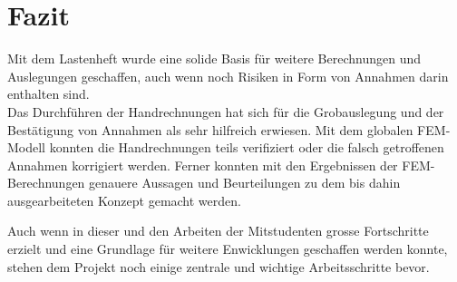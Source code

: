 \newpage

\section{Fazit}
Mit dem Lastenheft wurde eine solide Basis für weitere Berechnungen und Auslegungen geschaffen, auch wenn noch Risiken in Form von Annahmen darin enthalten sind.\\
Das Durchführen der Handrechnungen hat sich für die Grobauslegung und der Bestätigung von Annahmen als sehr hilfreich erwiesen. Mit dem globalen FEM-Modell konnten die Handrechnungen teils verifiziert oder die falsch getroffenen Annahmen korrigiert werden. Ferner konnten mit den Ergebnissen der FEM-Berechnungen genauere Aussagen und Beurteilungen zu dem bis dahin ausgearbeiteten Konzept gemacht werden.

Auch wenn in dieser und den Arbeiten der Mitstudenten grosse Fortschritte erzielt und eine Grundlage für weitere Enwicklungen geschaffen werden konnte, stehen dem Projekt noch einige zentrale und wichtige Arbeitsschritte bevor.
\newpage
